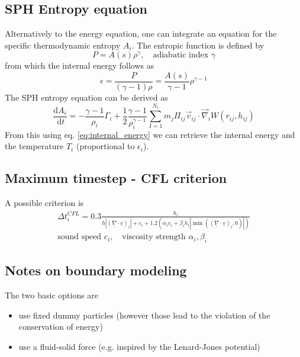 \subsection{SPH Entropy equation}
Alternatively to the energy equation, one can integrate an equation for the specific thermodynamic entropy $A_i$.
The entropic function is defined by
\begin{equation}
    P = A(s) \rho^\gamma, \quad \text{adiabatic index } \gamma
\end{equation}
from which the internal energy follows as
\begin{equation}
    \label{eq:internal_energy}
    \epsilon = \frac{P}{(\gamma - 1) \rho} = \frac{A(s)}{\gamma - 1} \rho^{\gamma - 1}
\end{equation}
The SPH entropy equation can be derived as
\begin{equation}
    \frac{\mathrm{d} A_i}{\mathrm{~d} t}=-\frac{\gamma-1}{\rho_i} \Gamma_i+\frac{1}{2} \frac{\gamma-1}{\rho_i^{\gamma-1}} \sum_{\mathrm{J}=1}^{N_i} m_j \Pi_{i j} \vec{v}_{i j} \cdot \vec{\nabla}_i W\left(r_{i j}, h_{i j}\right)
\end{equation}
From this using eq. \ref{eq:internal_energy} we can retrieve the internal energy and
the temperature $T_i$ (proportional to $\epsilon_i$).

\subsection{Maximum timestep - CFL criterion}
A possible criterion is
\begin{equation}
    \begin{gathered}
        \Delta t_i^{C F L}= 0.3 \frac{h_i}{h\left|(\underline{\nabla} \cdot \underline{v})_i\right|+c_i+1.2\left(\alpha_i c_i+\beta_i h_i\left|\min \left((\underline{\nabla} \cdot \underline{v})_i, 0\right)\right|\right)} \\
        \text{sound speed } c_i, \quad \text{viscosity strength } \alpha_i, \beta_i
    \end{gathered}
\end{equation}

\subsection{Notes on boundary modeling\skipthis}
The two basic options are
\begin{itemize}
    \item use fixed dummy particles (however those lead to the violation of the conservation of energy)
    \item use a fluid-solid force (e.g. inspired by the Lenard-Jones potential)
\end{itemize}

